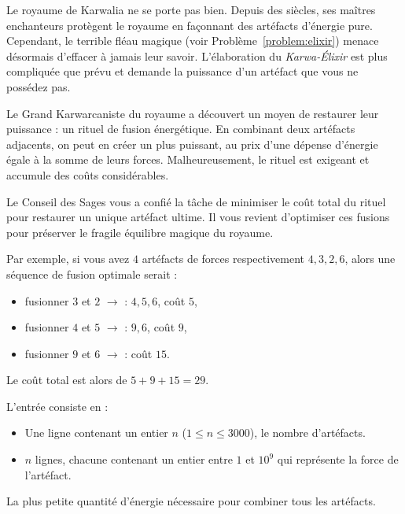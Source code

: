 \problemname{}


Le royaume de Karwalia ne se porte pas bien. Depuis des siècles, ses maîtres enchanteurs protègent le royaume en façonnant des artéfacts d'énergie pure. Cependant, le terrible fléau magique (voir Problème~\ref{problem:elixir}) menace désormais d'effacer à jamais leur savoir. L'élaboration du \emph{Karwa-Élixir} est plus compliquée que prévu et demande la puissance d'un artéfact que vous ne possédez pas.

Le Grand Karwarcaniste du royaume a découvert un moyen de restaurer leur puissance : un rituel de fusion énergétique. En combinant deux artéfacts adjacents, on peut en créer un plus puissant, au prix d'une dépense d'énergie égale à la somme de leurs forces. Malheureusement, le rituel est exigeant et accumule des coûts considérables.

Le Conseil des Sages vous a confié la tâche de minimiser le coût total du rituel pour restaurer un unique artéfact ultime. Il vous revient d'optimiser ces fusions pour préserver le fragile équilibre magique du royaume.

Par exemple, si vous avez $4$ artéfacts de forces respectivement $4, 3, 2, 6$, alors une séquence de fusion optimale serait :
\begin{itemize}
    \item fusionner $3$ et $2$ $\rightarrow$ : $4, 5, 6$, coût $5$,
    \item fusionner $4$ et $5$ $\rightarrow$ : $9, 6$, coût $9$,
    \item fusionner $9$ et $6$ $\rightarrow$ : coût $15$.
\end{itemize}
Le coût total est alors de $5 + 9 + 15 = 29$.

\begin{Input}
    L'entrée consiste en :
    \begin{itemize}
        \item Une ligne contenant un entier $n$ ($1 \leq n \leq 3000$), le nombre d'artéfacts.
        \item $n$ lignes, chacune contenant un entier entre $1$ et $10^{9}$ qui représente la force de l'artéfact.
    \end{itemize}
\end{Input}

\begin{Output}
    La plus petite quantité d'énergie nécessaire pour combiner tous les artéfacts.
\end{Output}
